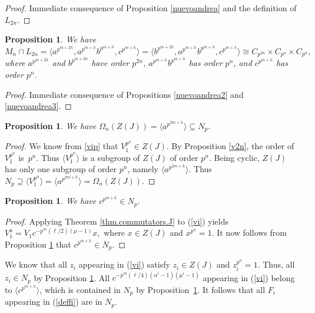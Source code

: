 \documentclass{amsart}
\newtheorem{prop}[theorem]{Proposition}
\theoremstyle{definition}
\theoremstyle{remark}
\begin{document}
\begin{proof} Immediate consequence of Proposition \ref{nuevoandrea} and the definition of $L_{2n}$.
\end{proof}


\begin{prop}\label{mln} We have
$$
M_n\cap L_{2n}=\langle a^{p^{m+2h}},a^{p^{m+h}}b^{p^{m+h}},c^{p^{m+h}}\rangle=
\langle b^{p^{m+2h}},a^{p^{m+h}}b^{p^{m+h}},c^{p^{m+h}}\rangle
\cong C_{p^{2n}}\times  C_{p^{n}}\times C_{p^{n}},
$$
where $a^{p^{m+2h}}$ and $b^{p^{m+2h}}$ have order $p^{2n}$, $a^{p^{m+h}}b^{p^{m+h}}$ has order $p^n$, 
and $c^{p^{m+h}}$ has order $p^n$.
\end{prop}

\begin{proof} Immediate consequence of Propositions \ref{nuevoandrea2} and \ref{nuevoandrea3}.
\end{proof}


\begin{prop}\label{ordnz} We have $\Omega_n(Z(J))=\langle a^{p^{2m+h}}\rangle\subseteq N_p$.
\end{prop}

\begin{proof} We know from \eqref{vip} that $V_1^{p^n}\in Z(J)$. By Proposition \ref{v2n},  the order of $V_1^{p^n}$ is~$p^n$.
Thus $\langle V_1^{p^n}\rangle$ is a subgroup of $Z(J)$ of order $p^n$.
Being cyclic, $Z(J)$ has only one subgroup of order $p^n$, namely $\langle a^{p^{2m+h}}\rangle$.
Thus $N_p\supseteq \langle V_1^{p^n}\rangle=\langle a^{p^{2m+h}}\rangle=\Omega_n(Z(J))$.
\end{proof}

\begin{prop}
\label{nor1} We have $c^{p^{m+h}}\in N_p$.
\end{prop}

\begin{proof} Applying Theorem \ref{thm.commutators.J} to (\ref{vi}) yields
$
V_1^a=V_1 c^{-p^m(\ell/2)(\mu-1)} x,
$
where $x\in Z(J)$ and $x^{p^n}=1$. It now follows from Proposition \ref{ordnz} that $c^{p^{m+h}}\in N_p$.
\end{proof}


We know that all $z_i$ appearing in (\ref{vi}) satisfy $z_i\in Z(J)$ and $z_i^{p^n}=1$. Thus, all $z_i\in N_p$ by Proposition  \ref{ordnz}.
All $c^{-p^m(\ell/4)(\alpha^i-1)(\mu^i-1)}$ appearing
in (\ref{vi}) belong to $\langle c^{p^{m+h}}\rangle$, which is contained in $N_p$ by Proposition~\ref{nor1}. It follows 
that all $F_i$ appearing in (\ref{deffi}) are in $N_p$.
\end{document}
